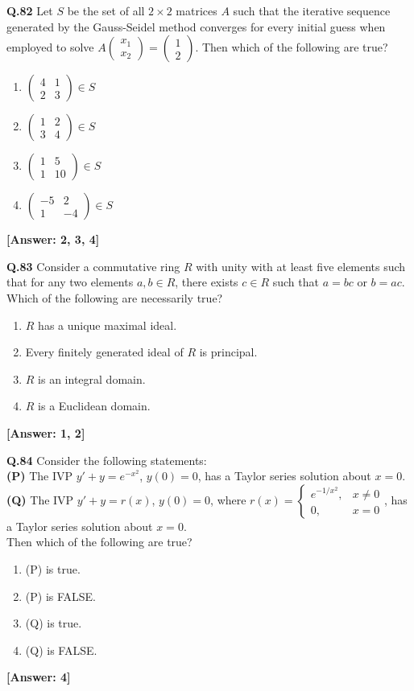 \documentclass[12pt,a4paper]{article}
\newcommand{\ans}[1]{\quad\textcolor{anscolor}{\textbf{[Answer: #1]}}}
\begin{document}
\textbf{Q.82} Let $S$ be the set of all $2\times2$ matrices $A$ such that the iterative sequence generated by the Gauss-Seidel method converges for every initial guess when employed to solve $A\begin{pmatrix}x_1\\x_2\end{pmatrix}=\begin{pmatrix}1\\2\end{pmatrix}$. Then which of the following are true?
\begin{enumerate}[label=\arabic*.]
\item $\begin{pmatrix}4&1\\2&3\end{pmatrix}\in S$
\item $\begin{pmatrix}1&2\\3&4\end{pmatrix}\in S$
\item $\begin{pmatrix}1&5\\1&10\end{pmatrix}\in S$
\item $\begin{pmatrix}-5&2\\1&-4\end{pmatrix}\in S$
\end{enumerate}\ans{2, 3, 4}

\textbf{Q.83} Consider a commutative ring $R$ with unity with at least five elements such that for any two elements $a,b\in R$, there exists $c\in R$ such that $a=bc$ or $b=ac$. Which of the following are necessarily true?
\begin{enumerate}[label=\arabic*.]
\item $R$ has a unique maximal ideal. \item Every finitely generated ideal of $R$ is principal.
\item $R$ is an integral domain. \item $R$ is a Euclidean domain.
\end{enumerate}\ans{1, 2}

\textbf{Q.84} Consider the following statements:\\
\textbf{(P)} The IVP $y'+y=e^{-x^2}$, $y(0)=0$, has a Taylor series solution about $x=0$.\\
\textbf{(Q)} The IVP $y'+y=r(x)$, $y(0)=0$, where $r(x)=\begin{cases}e^{-1/x^2},&x\neq0\\0,&x=0\end{cases}$, has a Taylor series solution about $x=0$.\\
Then which of the following are true?
\begin{enumerate}[label=\arabic*.]
\item (P) is true. \item (P) is FALSE.
\item (Q) is true. \item (Q) is FALSE.
\end{enumerate}\ans{4}
\end{document}
